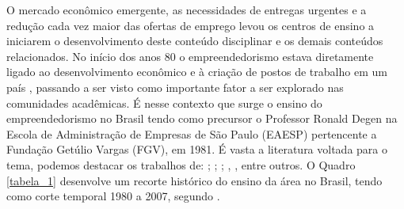 O mercado econômico emergente, as necessidades de entregas urgentes e a redução cada vez maior das ofertas de emprego levou os centros de ensino a iniciarem o desenvolvimento deste conteúdo disciplinar e os demais conteúdos relacionados. No início dos anos 80 o empreendedorismo estava diretamente ligado ao desenvolvimento econômico e à criação de postos de trabalho em um país \cite{rodrigues_intencao_2019}, passando a ser visto como importante fator a ser explorado nas comunidades acadêmicas. É nesse contexto que surge o ensino do empreendedorismo no Brasil tendo como precursor o Professor Ronald Degen \cite{koerner_designing_1990} na Escola de Administração de Empresas de São Paulo (EAESP) pertencente a Fundação Getúlio Vargas (FGV), em 1981. É vasta a literatura voltada para o tema, podemos destacar os trabalhos de: ; ; ; , , entre outros. O Quadro \ref{tabela_1} desenvolve um recorte histórico do ensino da área no Brasil, tendo como corte temporal 1980 a 2007, segundo \cite{fernandes_breve_2013}. 



